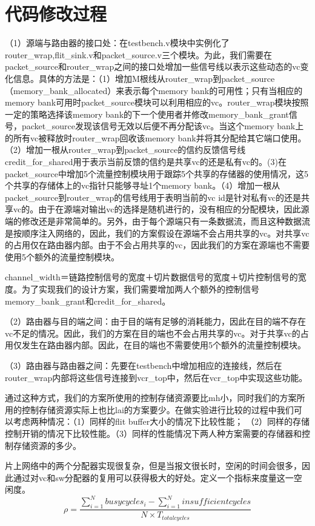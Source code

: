 ﻿\documentclass[10pt,journal]{IEEEtran}
\begin{document}
\section{代码修改过程}
（1）源端与路由器的接口处：在testbench.v模块中实例化了router\_wrap,flit\_sink.v和packet\_source.v三个模块。为此，我们需要在packet\_source和router\_wrap之间的接口处增加一些信号线以表示这些动态的vc变化信息。具体的方法是：（1）增加M根线从router\_wrap到packet\_source（memory\_bank\_allocated）来表示每个memory bank的可用性；只有当相应的memory bank可用时packet\_source模块可以利用相应的vc。router\_wrap模块按照一定的策略选择该memory bank的下一个使用者并修改memory\_bank\_grant信号，packet\_source发现该信号无效以后便不再分配该vc。当这个memory bank上的所有vc被释放时router\_wrap回收该memory bank并将其分配给其它端口使用。（2）增加一根从router\_wrap到packet\_source的信约反馈信号线credit\_for\_shared用于表示当前反馈的信约是共享vc的还是私有vc的。(3)在packet\_source中增加5个流量控制模块用于跟踪5个共享的存储器的使用情况，这5个共享的存储体上的vc指针只能够寻址1个memory bank。（4）增加一根从packet\_source到router\_wrap的信号线用于表明当前的vc id是针对私有vc的还是共享vc的。由于在源端对输出vc的选择是随机进行的，没有相应的分配模块，因此源端的修改还是非常简单的。另外，由于每个源端只有一条数据流，而且这种数据流是按顺序注入网络的，因此，我们的方案假设在源端不会占用共享的vc。对共享vc的占用仅在路由器内部。由于不会占用共享的vc，因此我们的方案在源端也不需要使用5个额外的流量控制模块。

channel\_width＝链路控制信号的宽度＋切片数据信号的宽度＋切片控制信号的宽度。为了实现我们的设计方案，我们需要增加两人个额外的控制信号memory\_bank\_grant和credit\_for\_shared。

（2）路由器与目的端之间：由于目的端有足够的消耗能力，因此在目的端不存在vc不足的情况。因此，我们的方案在目的端也不会占用共享的vc。对于共享vc的占用仅发生在路由器内部。因此，在目的端也不需要使用5个额外的流量控制模块。

（3）路由器与路由器之间：先要在testbench中增加相应的连接线，然后在router\_wrap内部将这些信号连接到vcr\_top中，然后在vcr\_top中实现这些功能。

通过这种方式，我们的方案所使用的控制存储资源要比mh小，同时我们的方案所用的控制存储资源实际上也比lai的方案要少。在做实验进行比较的过程中我们可以考虑两种情况：（1）同样的flit buffer大小的情况下比较性能； （2）同样的存储控制开销的情况下比较性能。（3）同样的性能情况下两人种方案需要的存储器和控制存储资源的多少。

片上网络中的两个分配器实现很复杂，但是当报文很长时，空闲的时间会很多，因此通过对vc和sw分配器的复用可以获得极大的好处。定义一个指标来度量这一空闲度。$$\rho=\frac{\sum_{i=1}^N busycycles_i-\sum_{i=1}^Ninsufficientcycles}{N\times T_{totalcycles}}$$
\end{document}
